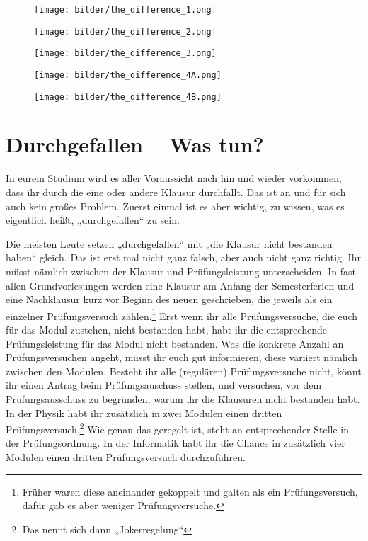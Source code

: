 
\begin{figure*}[t]
    \centering
    \begin{subfigure}[b]{.18\textwidth}
        \texttt{[image: bilder/the\_difference\_1.png]}
    \end{subfigure}
    \begin{subfigure}[b]{.18\textwidth}
        \texttt{[image: bilder/the\_difference\_2.png]}
    \end{subfigure}
    \begin{subfigure}[b]{.18\textwidth}
        \texttt{[image: bilder/the\_difference\_3.png]}
    \end{subfigure}
    \begin{subfigure}[b]{.18\textwidth}
        \texttt{[image: bilder/the\_difference\_4A.png]}
    \end{subfigure}
    \begin{subfigure}[b]{.18\textwidth}
        \texttt{[image: bilder/the\_difference\_4B.png]}
    \end{subfigure}
\end{figure*}

\section{Durchgefallen -- Was tun?}

In eurem Studium wird es aller Voraussicht nach hin und wieder vorkommen, dass ihr durch die eine oder andere Klausur durchfallt. Das ist an und für sich auch kein großes Problem. Zuerst einmal ist es aber wichtig, zu wissen, was es eigentlich heißt, „durchgefallen“ zu sein.

Die meisten Leute setzen „durchgefallen“ mit „die Klausur nicht bestanden haben“ gleich. Das ist erst mal nicht ganz falsch, aber auch nicht ganz richtig. Ihr müsst nämlich zwischen der Klausur und Prüfungsleistung unterscheiden. In fast allen Grundvorlesungen werden eine Klausur am Anfang der Semesterferien und eine Nachklausur kurz vor Beginn des neuen geschrieben, die jeweils als ein einzelner Prüfungsversuch zählen.\footnote{Früher waren diese aneinander gekoppelt und galten als ein Prüfungsversuch, dafür gab es aber weniger Prüfungsversuche.}
Erst wenn ihr alle Prüfungsversuche, die euch für das Modul zustehen, nicht bestanden habt, habt ihr die entsprechende Prüfungsleistung für das Modul nicht bestanden. Was die konkrete Anzahl an Prüfungsversuchen angeht, müsst ihr euch gut informieren, diese variiert nämlich zwischen den Modulen. Besteht ihr alle (regulären) Prüfungsversuche nicht, könnt ihr einen Antrag beim Prüfungsauschuss stellen, und versuchen, vor dem Prüfungsausschuss zu begründen, warum ihr die Klausuren nicht bestanden habt. In der Physik habt ihr zusätzlich in zwei Modulen einen dritten Prüfungsversuch.\footnote{Das nennt sich dann „Jokerregelung“} Wie genau das geregelt ist, steht an entsprechender Stelle in der Prüfungsordnung. In der Informatik habt ihr die Chance in zusätzlich vier Modulen einen dritten Prüfungsversuch durchzuführen.


